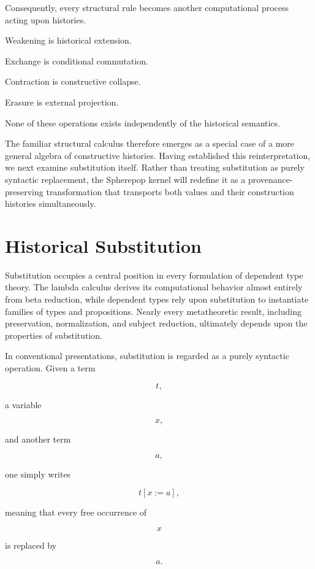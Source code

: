 \documentclass[12pt,oneside]{article}
\theoremstyle{definition}
\theoremstyle{remark}
\begin{document}
Consequently, every structural rule becomes another computational process acting
upon histories.

Weakening is historical extension.

Exchange is conditional commutation.

Contraction is constructive collapse.

Erasure is external projection.

None of these operations exists independently of the historical semantics.

The familiar structural calculus therefore emerges as a special case of a more
general algebra of constructive histories. Having established this
reinterpretation, we next examine substitution itself. Rather than treating
substitution as purely syntactic replacement, the Spherepop kernel will redefine
it as a provenance-preserving transformation that transports both values and
their construction histories simultaneously.

\section{Historical Substitution}

Substitution occupies a central position in every formulation of dependent type
theory. The lambda calculus derives its computational behavior almost entirely
from beta reduction, while dependent types rely upon substitution to instantiate
families of types and propositions. Nearly every metatheoretic result,
including preservation, normalization, and subject reduction, ultimately
depends upon the properties of substitution.

In conventional presentations, substitution is regarded as a purely syntactic
operation. Given a term

\[
t,
\]

a variable

\[
x,
\]

and another term

\[
a,
\]

one simply writes

\[
t[x:=a],
\]

meaning that every free occurrence of

\[
x
\]

is replaced by

\[
a.
\]
\end{document}

